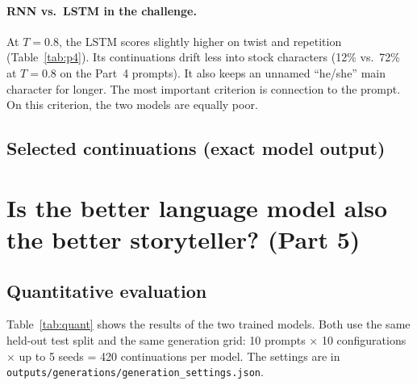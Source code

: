 \documentclass[11pt,a4paper]{article}
\begin{document}
\begin{table}[H]\centering
\caption{Prompt sensitivity (sampling configurations). Mean 4-gram Jaccard similarity between
continuations of different prompts with the same seed, and of the same prompt with different seeds.
Also, the share of cross-prompt pairs with identical first 10 tokens.}\label{tab:sens}
{\scriptsize}
\end{table}

\paragraph{RNN vs.\ LSTM in the challenge.} At $T=0.8$, the LSTM scores slightly higher on twist
and repetition (Table~\ref{tab:p4}). Its continuations drift less into stock characters
(12\% vs.\ 72\% at $T=0.8$ on the Part~4 prompts). It also keeps an unnamed ``he/she'' main
character for longer. The most important criterion is connection to the prompt. On this
criterion, the two models are equally poor.

\subsection*{Selected continuations (exact model output)}


\section{Is the better language model also the better storyteller? (Part 5)}
\label{sec:eval}
\subsection{Quantitative evaluation}
Table~\ref{tab:quant} shows the results of the two trained models. Both use the same held-out test
split and the same generation grid: 10 prompts $\times$ 10 configurations $\times$ up to 5 seeds =
420 continuations per model. The settings are in \texttt{outputs/generations/generation\_settings.json}.
\end{document}
